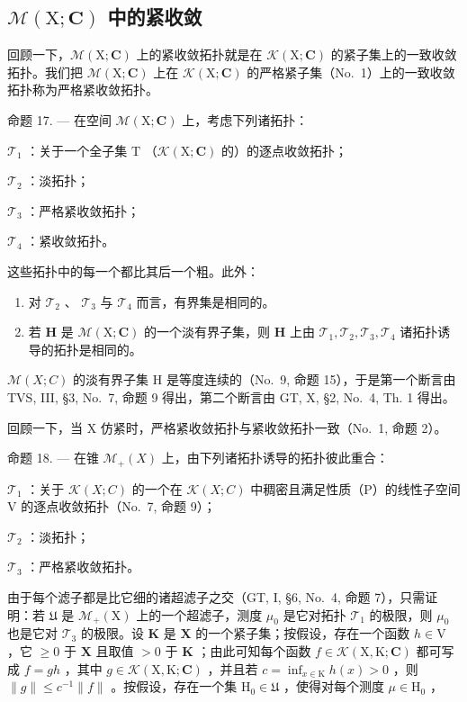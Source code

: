 \subsection{\texorpdfstring{\(\mathcal{M}(\mathrm{X};\mathbf{C})\) 中的紧收敛}{M(X; C) 中的紧收敛}}

回顾一下，\(\mathcal{M}(\mathrm{X};\mathbf{C})\) 上的紧收敛拓扑就是在 \(\mathcal{K}(\mathrm{X};\mathbf{C})\) 的紧子集上的一致收敛拓扑。我们把 \(\mathcal{M}(\mathrm{X};\mathbf{C})\) 上在 \(\mathcal{K}(\mathrm{X};\mathbf{C})\) 的严格紧子集（No.~1）上的一致收敛拓扑称为严格紧收敛拓扑。

命题 17. --- 在空间 \(\mathcal{M}(\mathrm{X};\mathbf{C})\) 上，考虑下列诸拓扑：

\(\mathcal{T}_1\) ：关于一个全子集 \(\mathrm{T}\) （\(\mathcal{K}(\mathrm{X};\mathbf{C})\) 的）的逐点收敛拓扑；

\(\mathcal{T}_2\) ：淡拓扑；

\(\mathcal{T}_3\) ：严格紧收敛拓扑；

\(\mathcal{T}_4\) ：紧收敛拓扑。

这些拓扑中的每一个都比其后一个粗。此外：

\begin{enumerate}
\def\labelenumi{(\roman{enumi})}
\item
  对 \(\mathcal{T}_2\) 、 \(\mathcal{T}_3\) 与 \(\mathcal{T}_4\) 而言，有界集是相同的。
\item
  若 \(\mathbf{H}\) 是 \(\mathcal{M}(\mathrm{X};\mathbf{C})\) 的一个淡有界子集，则 \(\mathbf{H}\) 上由 \(\mathcal{T}_1, \mathcal{T}_2, \mathcal{T}_3, \mathcal{T}_4\) 诸拓扑诱导的拓扑是相同的。
\end{enumerate}

\(\mathcal{M}(X;C)\) 的淡有界子集 H 是等度连续的（No.~9, 命题 15），于是第一个断言由 TVS, III, §3, No.~7, 命题 9 得出，第二个断言由 GT, X, §2, No.~4, Th. 1 得出。

回顾一下，当 X 仿紧时，严格紧收敛拓扑与紧收敛拓扑一致（No.~1, 命题 2）。

命题 18. --- 在锥 \(\mathcal{M}_{+}(X)\) 上，由下列诸拓扑诱导的拓扑彼此重合：

\(\mathcal{T}_{1}\) ：关于 \(\mathcal{K}(X;C)\) 的一个在 \(\mathcal{K}(X;C)\) 中稠密且满足性质（P）的线性子空间 V 的逐点收敛拓扑（No.~7, 命题 9）；

\(\mathcal{T}_2\) ：淡拓扑；

\(\mathcal{T}_3\) ：严格紧收敛拓扑。

由于每个滤子都是比它细的诸超滤子之交（GT, I, §6, No.~4, 命题 7），只需证明：若 \(\mathfrak{U}\) 是 \(\mathcal{M}_{+}(\mathrm{X})\) 上的一个超滤子，测度 \(\mu_0\) 是它对拓扑 \(\mathcal{T}_1\) 的极限，则 \(\mu_0\) 也是它对 \(\mathcal{T}_3\) 的极限。设 \(\mathbf{K}\) 是 \(\mathbf{X}\) 的一个紧子集；按假设，存在一个函数 \(h \in \mathrm{V}\) ，它 \(\geqslant 0\) 于 \(\mathbf{X}\) 且取值 \(>0\) 于 \(\mathbf{K}\) ；由此可知每个函数 \(f \in \mathcal{K}(\mathrm{X},\mathrm{K};\mathbf{C})\) 都可写成 \(f = gh\) ，其中 \(g \in \mathcal{K}(\mathrm{X},\mathrm{K};\mathbf{C})\) ，并且若 \(c = \inf_{x \in \mathrm{K}} h(x) > 0\) ，则 \(\| g \| \leqslant c^{-1} \| f \|\) 。按假设，存在一个集 \(\mathrm{H}_0 \in \mathfrak{U}\) ，使得对每个测度 \(\mu \in \mathrm{H}_0\) ，

